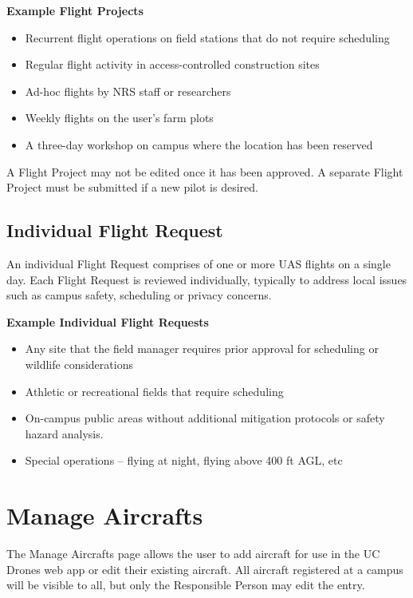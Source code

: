 \documentclass[
]{book}
\providecommand{\tightlist}{%
  \setlength{\itemsep}{0pt}\setlength{\parskip}{0pt}}
\begin{document}
\textbf{Example Flight Projects}

\begin{itemize}
\tightlist
\item
  Recurrent flight operations on field stations that do not require scheduling
\item
  Regular flight activity in access-controlled construction sites
\item
  Ad-hoc flights by NRS staff or researchers
\item
  Weekly flights on the user's farm plots
\item
  A three-day workshop on campus where the location has been reserved
\end{itemize}

A Flight Project may not be edited once it has been approved. A separate Flight Project must be submitted if a new pilot is desired.

\hypertarget{individual-flight-request}{%
\subsection{Individual Flight Request}\label{individual-flight-request}}

An individual Flight Request comprises of one or more UAS flights on a single day. Each Flight Request is reviewed individually, typically to address local issues such as campus safety, scheduling or privacy concerns.

\textbf{Example Individual Flight Requests}

\begin{itemize}
\tightlist
\item
  Any site that the field manager requires prior approval for scheduling or wildlife considerations
\item
  Athletic or recreational fields that require scheduling
\item
  On-campus public areas without additional mitigation protocols or safety hazard analysis.
\item
  Special operations -- flying at night, flying above 400 ft AGL, etc
\end{itemize}

\hypertarget{manage-aircrafts}{%
\section{Manage Aircrafts}\label{manage-aircrafts}}

The Manage Aircrafts page allows the user to add aircraft for use in the UC Drones web app or edit their existing aircraft. All aircraft registered at a campus will be visible to all, but only the Responsible Person may edit the entry.
\end{document}
